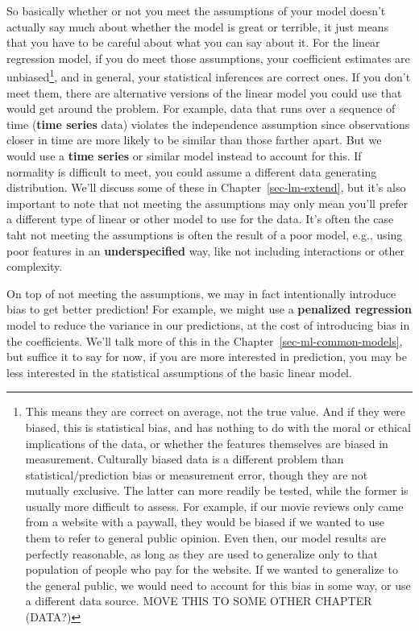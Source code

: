 \documentclass[
  letterpaper,
]{krantz}
\begin{document}
So basically whether or not you meet the assumptions of your model
doesn't actually say much about whether the model is great or terrible,
it just means that you have to be careful about what you can say about
it. For the linear regression model, if you do meet those assumptions,
your coefficient estimates are unbiased\footnote{This means they are
  correct on average, not the true value. And if they were biased, this
  is statistical bias, and has nothing to do with the moral or ethical
  implications of the data, or whether the features themselves are
  biased in measurement. Culturally biased data is a different problem
  than statistical/prediction bias or measurement error, though they are
  not mutually exclusive. The latter can more readily be tested, while
  the former is usually more difficult to assess. For example, if our
  movie reviews only came from a website with a paywall, they would be
  biased if we wanted to use them to refer to general public opinion.
  Even then, our model results are perfectly reasonable, as long as they
  are used to generalize only to that population of people who pay for
  the website. If we wanted to generalize to the general public, we
  would need to account for this bias in some way, or use a different
  data source. MOVE THIS TO SOME OTHER CHAPTER (DATA?)}, and in general,
your statistical inferences are correct ones. If you don't meet them,
there are alternative versions of the linear model you could use that
would get around the problem. For example, data that runs over a
sequence of time (\textbf{time series} data) violates the independence
assumption since observations closer in time are more likely to be
similar than those farther apart. But we would use a \textbf{time
series} or similar model instead to account for this. If normality is
difficult to meet, you could assume a different data generating
distribution. We'll discuss some of these in
Chapter~\ref{sec-lm-extend}, but it's also important to note that not
meeting the assumptions may only mean you'll prefer a different type of
linear or other model to use for the data. It's often the case taht not
meeting the assumptions is often the result of a poor model, e.g., using
poor features in an \textbf{underspecified} way, like not including
interactions or other complexity.

On top of not meeting the assumptions, we may in fact intentionally
introduce bias to get better prediction! For example, we might use a
\textbf{penalized regression} model to reduce the variance in our
predictions, at the cost of introducing bias in the coefficients. We'll
talk more of this in the Chapter~\ref{sec-ml-common-models}, but suffice
it to say for now, if you are more interested in prediction, you may be
less interested in the statistical assumptions of the basic linear
model.
\end{document}
